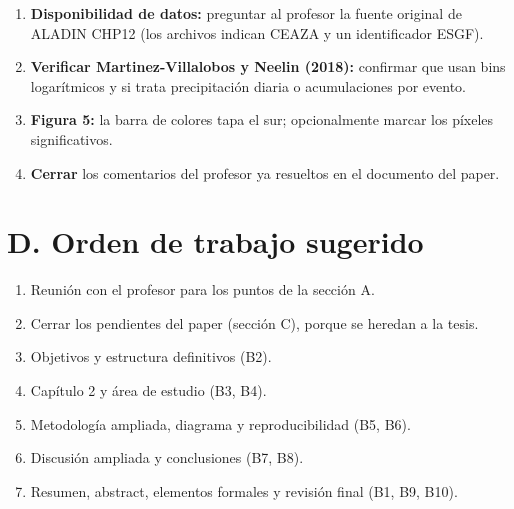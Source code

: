 \begin{enumerate}
\item
  \textbf{Disponibilidad de datos:} preguntar al profesor la fuente original de ALADIN CHP12 (los archivos indican CEAZA y un identificador ESGF).
\item
  \textbf{Verificar Martinez-Villalobos y Neelin (2018):} confirmar que usan bins logarítmicos y si trata precipitación diaria o acumulaciones por evento.
\item
  \textbf{Figura 5:} la barra de colores tapa el sur; opcionalmente marcar los píxeles significativos.
\item
  \textbf{Cerrar} los comentarios del profesor ya resueltos en el documento del paper.
\end{enumerate}

\section*{D. Orden de trabajo sugerido}\label{d.-orden-de-trabajo-sugerido}

\begin{enumerate}
\def\labelenumi{\arabic{enumi}.}
\tightlist
\item
  Reunión con el profesor para los puntos de la sección A.
\item
  Cerrar los pendientes del paper (sección C), porque se heredan a la tesis.
\item
  Objetivos y estructura definitivos (B2).
\item
  Capítulo 2 y área de estudio (B3, B4).
\item
  Metodología ampliada, diagrama y reproducibilidad (B5, B6).
\item
  Discusión ampliada y conclusiones (B7, B8).
\item
  Resumen, abstract, elementos formales y revisión final (B1, B9, B10).
\end{enumerate}
